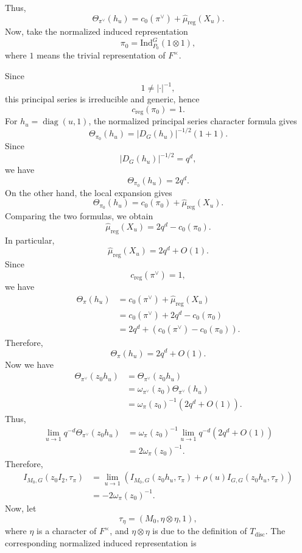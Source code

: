 \documentclass[11pt]{amsart}
\renewcommand{\rm}{\mathrm}
\theoremstyle{definition}
\numberwithin{equation}{section}
\begin{document}
	
	Thus,
	\[
	\Theta_{\pi^\vee}(h_u) = c_0(\pi^\vee) + \widehat{\mu}_{\mathrm{reg}}(X_u).
	\]
	Now, take the normalized induced representation
	\[
	\pi_0 = \rm{Ind}_{P_0}^G(1 \otimes 1),
	\]where \(1\) means the trivial representation of \(F^\times\).
	
	
	Since
	\[
	1 \neq |\cdot|^{-1},
	\]
	this principal series is irreducible and generic, hence
	\[
	c_{\mathrm{reg}}(\pi_0) = 1.
	\]
	For \(h_u = \operatorname{diag}(u, 1)\), the normalized principal series character formula gives
	\[
	\Theta_{\pi_0}(h_u) = |D_G(h_u)|^{-1/2}(1+1).
	\]
	Since
	\[
	|D_G(h_u)|^{-1/2} = q^{d},
	\]
	we have
	\[
	\Theta_{\pi_0}(h_u) = 2q^d.
	\]
	On the other hand, the local expansion gives
	\[
	\Theta_{\pi_0}(h_u) = c_0(\pi_0) + \widehat{\mu}_{\mathrm{reg}}(X_u).
	\]
	Comparing the two formulas, we obtain
	\[
	\widehat{\mu}_{\mathrm{reg}}(X_u) = 2q^d - c_0(\pi_0).
	\]
	In particular,
	\[
	\widehat{\mu}_{\mathrm{reg}}(X_u) = 2q^d + O(1).
	\]
	Since
	\[
	c_{\mathrm{reg}}(\pi^\vee) = 1,
	\]
	we have
	\[
	\begin{aligned}
		\Theta_\pi(h_u) &= c_0(\pi^\vee) + \widehat{\mu}_{\mathrm{reg}}(X_u) \\
		&= c_0(\pi^\vee) + 2q^d - c_0(\pi_0) \\
		&= 2q^d + (c_0(\pi^\vee) - c_0(\pi_0)).
	\end{aligned}
	\]
	Therefore,
	\[
	\Theta_\pi(h_u) = 2q^d + O(1).
	\]
	Now we have
	\[
	\begin{aligned}
		\Theta_{\pi^\vee}(z_0h_u) &= \Theta_{\pi^\vee}(z_0 h_u) \\
		&= \omega_{\pi^\vee}(z_0) \Theta_{\pi^\vee}(h_u) \\
		&= \omega_\pi(z_0)^{-1} (2q^d + O(1)).
	\end{aligned}
	\]
	Thus,
	\[
	\begin{aligned}
		\lim_{u \to 1} q^{-d} \Theta_{\pi^\vee}(z_0h_u) &= \omega_\pi(z_0)^{-1} \lim_{u \to 1} q^{-d} (2q^d + O(1)) \\
		&= 2\omega_\pi(z_0)^{-1}.
	\end{aligned}
	\]
	Therefore,
	\[
	\begin{aligned}
		I_{M_0,G}(z_0I_2, \tau_\pi) &= \lim_{u \to 1} (I_{M_0,G}(z_0h_u, \tau_\pi) + \rho(u) I_{G,G}(z_0h_u, \tau_\pi)) \\
		&= -2\omega_\pi(z_0)^{-1}.
	\end{aligned}
	\]
	Now, let
	\[
	\tau_\eta = (M_0, \eta \otimes \eta,1),
	\]
	where \(\eta\) is a character of \(F^\times\), and \(\eta\otimes \eta\) is due to the definition of \(T_{\rm{disc}}\). The corresponding normalized induced representation is
\end{document}
